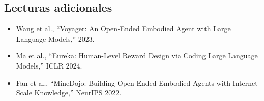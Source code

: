 \subsection{Lecturas adicionales}

\begin{itemize}
    \item Wang et al., ``Voyager: An Open-Ended Embodied Agent with Large Language Models,'' 2023.
    \item Ma et al., ``Eureka: Human-Level Reward Design via Coding Large Language Models,'' ICLR 2024.
    \item Fan et al., ``MineDojo: Building Open-Ended Embodied Agents with Internet-Scale Knowledge,'' NeurIPS 2022.
\end{itemize}



